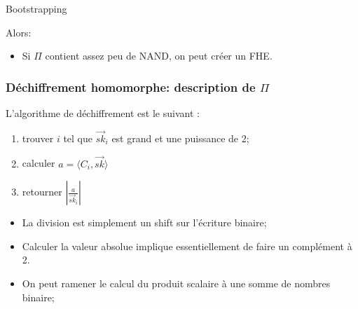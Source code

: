 \documentclass[10pt,xcolor={usenames,dvipsnames}]{beamer}
\begin{document}
\begin{section}{Bootstrapping}
\begin{frame}[fragile]
\pause
Alors:
\vspace{-0.5cm}
\begin{center}
\end{center}

\begin{itemize}
\item Si $\Pi$ contient assez peu de NAND, on peut créer un FHE.
\end{itemize}

\end{frame} 


\begin{frame}
\frametitle{Déchiffrement homomorphe: description de $\Pi$}
L'algorithme de déchiffrement est le suivant :
\begin{enumerate}
\item trouver $i$ tel que $\vec{sk}_i$ est grand et une puissance de 2; 
\item calculer $a = \langle C_i , \vec{sk} \rangle$
\item retourner $|\frac{a}{\vec{sk}_i}|$
\end{enumerate}
\pause
\begin{itemize}
\item La division est simplement un shift sur l'écriture binaire; 
\item Calculer la valeur absolue implique essentiellement de faire un complément à 2. \pause
\item On peut ramener le calcul du produit scalaire à une somme de nombres binaire;
\end{itemize}


\end{frame}
\end{section}
\end{document}
